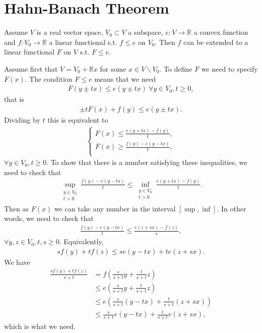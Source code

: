\section*{Hahn-Banach Theorem}
\begin{theorem}
    Assume \(V\) is a real vector space, \(V_0\subset V\) a subspace, \(e:V\rightarrow\mathbb{R}\) a convex function and 
    \(f:V_0\rightarrow\mathbb{R}\) a linear functional s.t. \(f\leq e\) on \(V_0\). Then \(f\) can be extended to a linear functional 
    \(F\) on \(V\) s.t. \(F\leq e\).
\end{theorem}
\ifdetailed
Assume first that \(V = V_0 + \mathbb{R}x\) for some \(x\in V\backslash V_0\). To define \(F\) we need to specify \(F(x)\). The condition \(F\leq e\)
means that we need
\begin{align*}
    F(y\pm tx) \leq e(y\pm tx) \ \forall y\in V_0, t\geq 0,
\end{align*}
that is 
\begin{align*}
    \pm t F(x) + f(y) \leq e(y\pm tx).
\end{align*}
Dividing by \(t\) this is equivalent to 
\begin{align*}
    \begin{cases} 
        F(x) \leq \frac{e(y+tx)-f(y)}{t}, \\
        F(x) \geq \frac{f(y)-e(y-tx)}{t}, \\
     \end{cases}
\end{align*}
\(\forall y\in V_0, t\geq0\). To show that there is a number satisfying these inequalities, we need to check that
\begin{align*}
    \sup\limits_{\substack{y\in V_0 \\ t>0}} \frac{f(y)-e(y-tx)}{t} \leq \inf\limits_{\substack{y\in V_0 \\ t>0}} \frac{e(y+tx)-f(y)}{t}.
\end{align*}
Then as \(F(x)\) we can take any number in the interval \([\sup,\inf]\). In other words, we need to check that
\begin{align*}
    \frac{f(y)-e(y-tx)}{t} \leq \frac{e(z+sx)-f(z)}{s},
\end{align*}
\(\forall y,z\in V_0, t,s\geq0\). Equivalently, 
\begin{align*}
    sf(y) + tf(z) \leq se(y-tx) + te(z+sx).
\end{align*}
We have
\begin{align*}
    \frac{sf(y) +tf(z)}{s+t} &= f\left(\frac{s}{s+t}y + \frac{t}{s+t}z\right) \\
    &\leq e\left(\frac{s}{s+t}y + \frac{t}{s+t}z\right) \\
    &\leq e\left(\frac{s}{s+t}(y-tx) + \frac{t}{s+t}(z+sx)\right) \\
    &\leq \frac{s}{s+t}e\left(y-tx\right) + \frac{t}{s+t}e\left(z+sx\right),
\end{align*}
which is what we need. 

